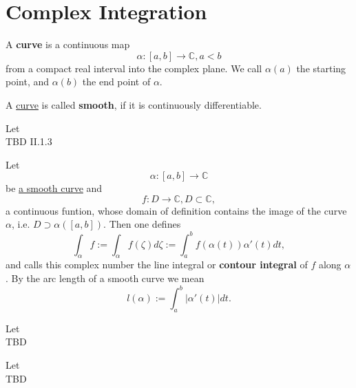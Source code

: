 \section{Complex Integration}


\begin{definition}[Curve (II.1.1)]
    \label{sec:Curve}
    A \textbf{curve} is a continuous map
    $$\alpha: [a,b] \rightarrow \mathbb{C}, a < b$$
    from a compact real interval into the complex plane. We call $\alpha(a)$ the starting point,
    and $\alpha(b)$ the end point of $\alpha$.
\end{definition}


\begin{definition}
    \label{sec:SmoothCurve}
    A \hyperref[sec:Curve]{curve} is called \textbf{smooth}, if it is continuously differentiable.
\end{definition}


\begin{definition}
    \label{sec:PiecewiseSmoothCurve}
    Let\\
    TBD II.1.3
\end{definition}


\begin{definition}
    \label{sec:ContourIntegral}
    Let
    $$\alpha : [a, b] \rightarrow \mathbb{C}$$
    be \hyperref[sec:SmoothCurve]{a smooth curve} and
    $$f: D \rightarrow \mathbb{C}, D \subset \mathbb{C},$$
    a continuous funtion, whose domain of definition contains the image of the curve $\alpha$,
    i.e. $D \supset \alpha([a,b]).$ Then one defines
    $$ \int_\alpha f:= \int_\alpha f(\zeta) d\zeta := \int_a^b f(\alpha(t))\alpha'(t)dt,$$
    and calls this complex number the line integral or \textbf{contour integral} of $f$ along $\alpha$.
    By the arc length of a smooth curve we mean
    $$l(\alpha):=\int_a^b |\alpha'(t)|dt.$$
\end{definition}


\begin{definition}
    \label{sec:PropContourIntegral}
    Let\\
    TBD
\end{definition}


\begin{definition}
    \label{sec:ArcwiseConnected}
    Let\\
    TBD
\end{definition}


